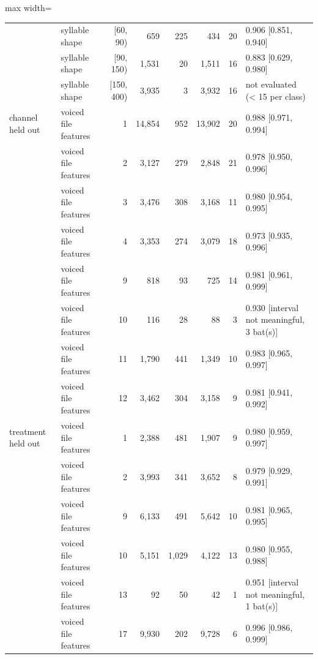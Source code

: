 \begin{table}[htbp]
\begin{adjustbox}{max width=\linewidth}
\begin{tabular}{llrrrrrl}
 & syllable shape & [60, 90) & 659 & 225 & 434 & 20 & 0.906 [0.851, 0.940] \\
 & syllable shape & [90, 150) & 1,531 & 20 & 1,511 & 16 & 0.883 [0.629, 0.980] \\
 & syllable shape & [150, 400) & 3,935 & 3 & 3,932 & 16 & not evaluated (< 15 per class) \\
channel held out & voiced file features & 1 & 14,854 & 952 & 13,902 & 20 & 0.988 [0.971, 0.994] \\
 & voiced file features & 2 & 3,127 & 279 & 2,848 & 21 & 0.978 [0.950, 0.996] \\
 & voiced file features & 3 & 3,476 & 308 & 3,168 & 11 & 0.980 [0.954, 0.995] \\
 & voiced file features & 4 & 3,353 & 274 & 3,079 & 18 & 0.973 [0.935, 0.996] \\
 & voiced file features & 9 & 818 & 93 & 725 & 14 & 0.981 [0.961, 0.999] \\
 & voiced file features & 10 & 116 & 28 & 88 & 3 & 0.930 [interval not meaningful, 3 bat(s)] \\
 & voiced file features & 11 & 1,790 & 441 & 1,349 & 10 & 0.983 [0.965, 0.997] \\
 & voiced file features & 12 & 3,462 & 304 & 3,158 & 9 & 0.981 [0.941, 0.992] \\
treatment held out & voiced file features & 1 & 2,388 & 481 & 1,907 & 9 & 0.980 [0.959, 0.997] \\
 & voiced file features & 2 & 3,993 & 341 & 3,652 & 8 & 0.979 [0.929, 0.991] \\
 & voiced file features & 9 & 6,133 & 491 & 5,642 & 10 & 0.981 [0.965, 0.995] \\
 & voiced file features & 10 & 5,151 & 1,029 & 4,122 & 13 & 0.980 [0.955, 0.988] \\
 & voiced file features & 13 & 92 & 50 & 42 & 1 & 0.951 [interval not meaningful, 1 bat(s)] \\
 & voiced file features & 17 & 9,930 & 202 & 9,728 & 6 & 0.996 [0.986, 0.999] \\
\bottomrule
\end{tabular}
\end{adjustbox}
\end{table}
